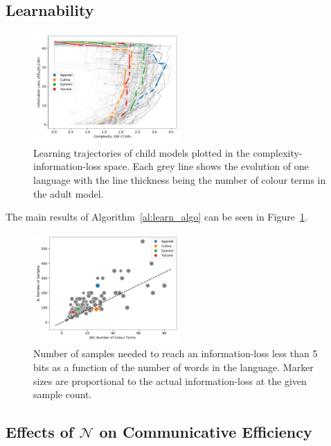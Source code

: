 \documentclass[11pt]{article}
\begin{document}
\subsection{Learnability}
\label{ssec:results_learning}

\begin{figure}
    \centering
    \includegraphics[width=0.5\textwidth]{docs/final_report_for_course/graphs/cplx_inf_loss.pdf}
    \caption{Learning trajectories of child models plotted in the complexity-information-loss space. Each grey line shows the evolution of one language with the line thickness being the number of colour terms in the adult model.}
    \label{fig:learn_infloss_complex}
\end{figure}

The main results of Algorithm~\ref{al:learn_algo} can be seen in Figure~\ref{fig:learn_infloss_complex}.
 
 \begin{figure}
     \centering
     \includegraphics[width=0.5\textwidth]{docs/final_report_for_course/graphs/nw_samples.pdf}
     \caption{Number of samples needed to reach an information-loss less than 5 bits as a function of the number of words in the language. Marker sizes are proportional to the actual information-loss at the given sample count.}
     \label{fig:nw_samples}
 \end{figure}
 
\subsection{Effects of $\mathcal{N}$ on Communicative Efficiency}
\end{document}
